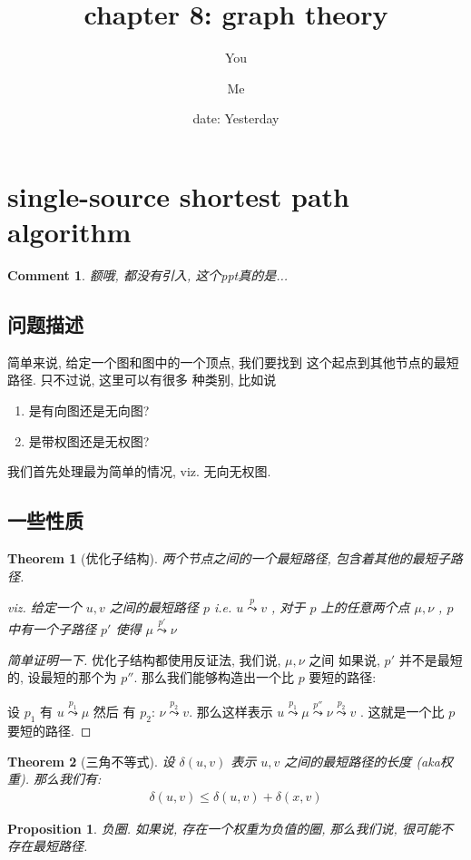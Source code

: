 \documentclass[a4paper, 10pt]{ctexart} %
\title{chapter 8: graph theory}
\author{You \and Me}
\date{date: Yesterday}
\newtheorem{theorem}{Theorem}
\newtheorem{corollary}{Comment}
\newtheorem{proposition}{Proposition}
\begin{document}
\maketitle
\tableofcontents
\newpage
\section{single-source shortest path algorithm}
\begin{corollary}
    额哦, 都没有引入, 这个ppt真的是...
\end{corollary}
\subsection{问题描述} %
\label{sub:问题描述}
简单来说, 给定一个图和图中的一个顶点, 我们要找到
这个起点到其他节点的最短路径. 只不过说, 这里可以有很多
种类别, 比如说
\begin{enumerate}
    \item 是有向图还是无向图?
    \item 是带权图还是无权图?
\end{enumerate}

我们首先处理最为简单的情况, viz. 无向无权图. 

\subsection{一些性质} %
\label{sub:一些性质ofshortestpath}
\begin{theorem}[优化子结构]
    两个节点之间的一个最短路径, 包含着其他的最短子路径. 

    viz. 
    给定一个 $u,v$ 之间的最短路径 $p$ 
    i.e. $u \overset{p}{\leadsto}v$ ,
    对于 $p$ 上的任意两个点 $\mu ,\nu$
    , $p$ 中有一个子路径 $p'$ 使得 
    $ \mu \overset{p'}{\leadsto} \nu$
\end{theorem}
\begin{proof}[简单证明一下]
优化子结构都使用反证法, 我们说, $ \mu , \nu$ 之间
如果说, $p'$ 并不是最短的, 设最短的那个为 $p''$.
那么我们能够构造出一个比 $p$ 要短的路径:

设 $p_{1}$ 有 $u \overset{p_{1}}{\leadsto} \mu$ 然后 有 $p_{2}$: 
$\nu  \overset{p_{2}}{\leadsto} v$.
那么这样表示 $u \overset{p_{1}}{\leadsto} \mu \overset{p''}{\leadsto} \nu \overset{p_{2}}{\leadsto} v$ .
这就是一个比 $p$ 要短的路径.
\end{proof}
\begin{theorem}[三角不等式]
设 $\delta \left( u ,v\right)$ 表示 $ u ,v$ 之间的最短路径的长度 (aka权重).
那么我们有: 
\begin{align*}
\delta \left( u ,v\right) \le \delta \left( u ,v\right) + \delta \left( x,  v\right)
\end{align*}
\end{theorem}
\begin{proposition}
负圈. 如果说, 存在一个权重为负值的圈, 那么我们说, 
很可能不存在最短路径.
\end{proposition}
\end{document}
